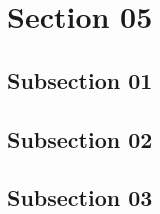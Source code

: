 \section{Section 05}
\subsection{Subsection 01}
\lipsum[1-5]
\subsection{Subsection 02}
\lipsum[1-5]
\subsection{Subsection 03}
\lipsum[1-5]
